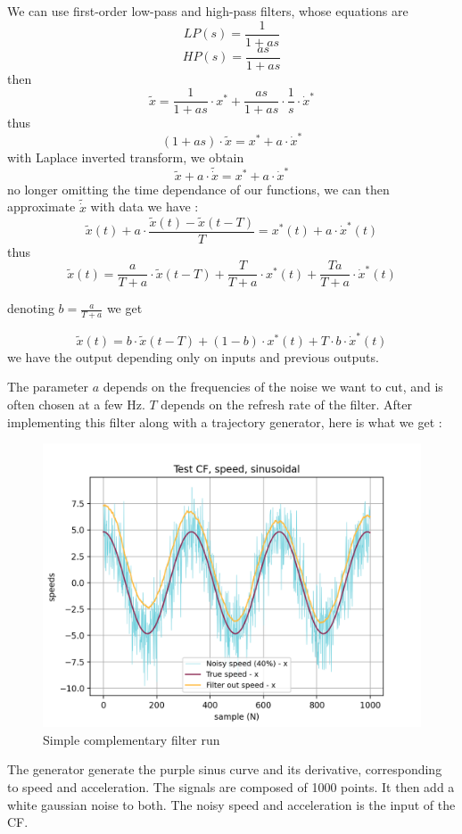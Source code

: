 \documentclass[a4paper,10pt]{article}
\begin{document}
We can use first-order low-pass and high-pass filters, whose equations are
$$LP(s) = \frac{1}{1+as}$$
$$HP(s) = \frac{as}{1+as}$$
then
$$\widetilde{x} = \frac{1}{1+as} \cdot x^* + \frac{as}{1+as} \cdot \frac{1}{s} \cdot \dot x^* $$
thus
$$ (1+as) \cdot \tilde{x} = x^* + a\cdot \dot x^*$$
with Laplace inverted transform, we obtain
$$\widetilde{x} + a\cdot \tilde{\dot x} = x^* + a\cdot \dot x^*$$
no longer omitting the time dependance of our functions, we can then approximate $\tilde{\dot x}$ with data we have :
$$\widetilde{x}(t) + a\cdot\frac{\widetilde{x}(t) - \widetilde{x}(t-T)}{T} = x^*(t) + a\cdot \dot x^*(t)$$
thus
$$\widetilde{x}(t) = \frac{a}{T+a}\cdot \widetilde{x}(t-T) + \frac{T}{T+a}\cdot x^*(t) + \frac{Ta}{T+a}\cdot \dot x^*(t) $$

\vspace{4mm}

\noindent denoting $b=\frac{a}{T+a}$ we get

\vspace{2mm}


$$\widetilde{x}(t) = b\cdot \widetilde{x}(t-T) + (1-b)\cdot x^*(t) + T\cdot b\cdot \dot x^*(t) $$
we have the output depending only on inputs and previous outputs.

\bigskip
The parameter $a$ depends on the frequencies of the noise we want to cut, and is often chosen at a few Hz. $T$ depends on the refresh rate of the filter.
After implementing this filter along with a trajectory generator, here is what we get :

\begin{figure}[H]
\centering
  \includegraphics[width=\linewidth, angle=0, scale=0.8]{./images/CF_withoutoffset.png}
  \caption{Simple complementary filter run}
\end{figure}
The generator generate the purple sinus curve and its derivative, corresponding to speed and acceleration. The signals are composed of 1000 points. It then add a white gaussian noise to both. The noisy speed and acceleration is the input of the CF.\\
\end{document}
